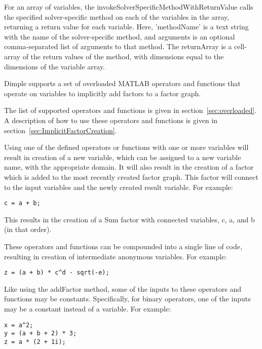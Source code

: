 For an array of variables, the invokeSolverSpecificMethodWithReturnValue calls the specified solver-specific method on each of the variables in the array, returning a return value for each variable.  Here, 'methodName' is a text string with the name of the solver-specific method, and arguments is an optional comma-separated list of arguments to that method.  The returnArray is a cell-array of the return values of the method, with dimensions equal to the dimensions of the variable array.

\fi

\ifmatlab
{}


Dimple supports a set of overloaded MATLAB operators and functions that operate on variables to implicitly add factors to a factor graph.

The list of supported operators and functions is given in section~\ref{sec:overloaded}.  A description of how to use these operators and functions is given in section~\ref{sec:ImplicitFactorCreation}.

Using one of the defined operators or functions with one or more variables will result in creation of a new variable, which can be assigned to a new variable name, with the appropriate domain.  It will also result in the creation of a factor which is added to the most recently created factor graph.  This factor will connect to the input variables and the newly created result variable.  For example:

\begin{lstlisting}
c = a + b;
\end{lstlisting}

This results in the creation of a Sum factor with connected variables, c, a, and b (in that order).

These operators and functions can be compounded into a single line of code, resulting in creation of intermediate anonymous variables.  For example:

\begin{lstlisting}
z = (a + b) * c^d - sqrt(-e);
\end{lstlisting}

Like using the addFactor method, some of the inputs to these operators and functions may be constants.  Specifically, for binary operators, one of the inputs may be a constant instead of a variable.  For example:

\begin{lstlisting}
x = a^2;
y = (a + b + 2) * 3;
z = a * (2 + 1i);
\end{lstlisting}

